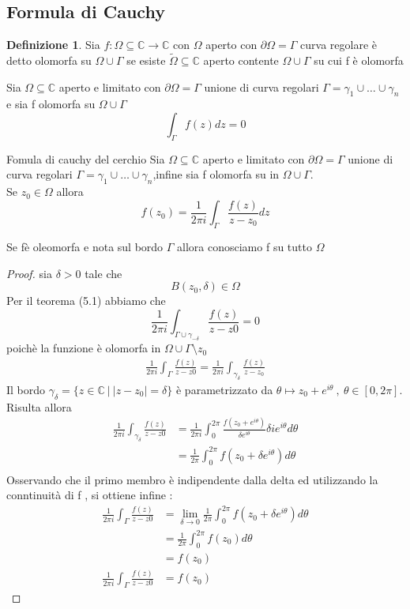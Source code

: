 \documentclass{article}
\theoremstyle{definition}
\newtheorem*{definizione}{Definizione}
\newcommand{\C}{\mathbb{C}}
\newcommand{\norm}[1]{|#1|}
\begin{document}
	\subsection{Formula di Cauchy}
	\begin{definizione}
		Sia $f:\Omega \subseteq \C \rightarrow \C $ con $\Omega$ aperto con $\partial \Omega = \Gamma$ curva regolare è detto olomorfa su $\Omega \cup \Gamma$ se esiste $\tilde{\Omega} \subseteq \C$ aperto contente  $\Omega \cup \Gamma$ su cui f è olomorfa 
	\end{definizione}
	\begin{teo}{}{}
		Sia $\Omega \subseteq \C $ aperto e limitato con $\partial \Omega = \Gamma$ unione di curva regolari $\Gamma=\gamma_1 \cup \dots \cup \gamma_n$ e sia f olomorfa su $\Omega \cup \Gamma$
		$$\int_{\Gamma}f(z)dz=0$$
	\end{teo}
	\begin{teo}{Fomula di cauchy del cerchio}{}
			Sia $\Omega \subseteq \C $ aperto e limitato con $\partial \Omega = \Gamma$ unione di curva regolari $\Gamma=\gamma_1 \cup \dots \cup \gamma_n$,infine sia f olomorfa su in $\Omega \cup \Gamma$. \\ Se $z_0 \in \Omega $ allora 
			$$f(z_0)=\frac{1}{2 \pi i } \int_{\Gamma} \frac{f(z)}{z-z_0}dz $$
	\end{teo}
	Se fè oleomorfa e nota sul bordo $\Gamma$ allora conosciamo f su tutto $\Omega$ 
	\begin{proof}
		sia $\delta > 0$ tale che $$B(z_0 , \delta)\in \Omega$$ Per il teorema (5.1) abbiamo che $$\frac{1}{2 \pi i }\int_{\Gamma \cup \gamma_{-\delta}} \frac{f(z)}{z-z0}=0$$ poichè la funzione è olomorfa in $\Omega \cup \Gamma \setminus z_0$
		\begin{align*}
			\frac{1}{2 \pi i }\int_{\Gamma} \frac{f(z)}{z-z0}=\frac{1}{2 \pi i }\int_{\gamma_{\delta}} \frac{f(z)}{z-z_0}
		\end{align*}
		Il bordo $\gamma_\delta= \{z \in \C \ |\ \norm{z-z_0}=\delta\}$ è parametrizzato da $\theta \mapsto z_0+e^{i\theta } \ ,\ \theta \in [0,2\pi]$. Risulta allora 
		\begin{align*}
\frac{1}{2 \pi i }\int_{\gamma_{\delta}} \frac{f(z)}{z-z0} &= \frac{1}{2 \pi i }\int_{0}^{2\pi} \frac{f(z_0+e^{i\theta})}{\delta e^{i\theta }}\delta ie^{i\theta } d\theta \\
&=\frac{1}{2 \pi } \int_{0}^{2\pi}f(z_0+\delta e^{i\theta})d\theta\\
		\end{align*}
		Osservando che il primo membro è indipendente dalla delta ed utilizzando la conntinuità di f , si ottiene infine :
		\begin{align*}
			\frac{1}{2 \pi i }\int_{\Gamma} \frac{f(z)}{z-z0}&=\lim_{\delta \rightarrow 0} \frac{1}{2 \pi } \int_{0}^{2\pi}f(z_0+\delta e^{i\theta})d\theta\\ 
			&=\frac{1}{2\pi}\int_{0}^{2\pi}f(z_0)d\theta\\ 
			&= f(z_0) \\
			\frac{1}{2 \pi i }	\int_{\Gamma} \frac{f(z)}{z-z0}&=f(z_0)
		\end{align*}
	\end{proof}
\end{document}
